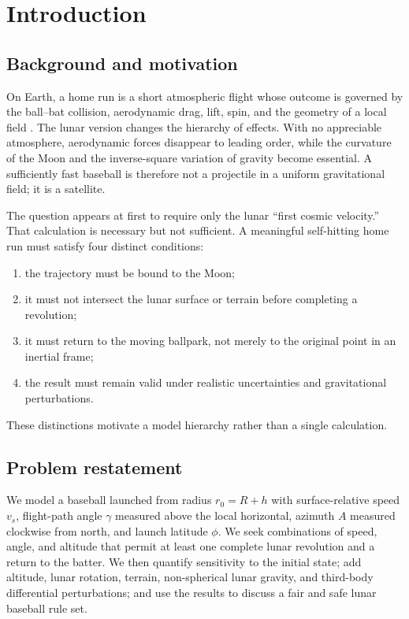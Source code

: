 \maketitle

\clearpage
\tableofcontents
\newpage
\section{Introduction}

\subsection{Background and motivation}

On Earth, a home run is a short atmospheric flight whose outcome is governed by the ball--bat collision, aerodynamic drag, lift, spin, and the geometry of a local field \cite{Nathan2000,Adair2002}. The lunar version changes the hierarchy of effects. With no appreciable atmosphere, aerodynamic forces disappear to leading order, while the curvature of the Moon and the inverse-square variation of gravity become essential. A sufficiently fast baseball is therefore not a projectile in a uniform gravitational field; it is a satellite.

The question appears at first to require only the lunar ``first cosmic velocity.'' That calculation is necessary but not sufficient. A meaningful self-hitting home run must satisfy four distinct conditions:
\begin{enumerate}
    \item the trajectory must be bound to the Moon;
    \item it must not intersect the lunar surface or terrain before completing a revolution;
    \item it must return to the moving ballpark, not merely to the original point in an inertial frame;
    \item the result must remain valid under realistic uncertainties and gravitational perturbations.
\end{enumerate}
These distinctions motivate a model hierarchy rather than a single calculation.

\subsection{Problem restatement}

We model a baseball launched from radius $r_0=R+h$ with surface-relative speed $v_s$, flight-path angle $\gamma$ measured above the local horizontal, azimuth $A$ measured clockwise from north, and launch latitude $\phi$. We seek combinations of speed, angle, and altitude that permit at least one complete lunar revolution and a return to the batter. We then quantify sensitivity to the initial state; add altitude, lunar rotation, terrain, non-spherical lunar gravity, and third-body differential perturbations; and use the results to discuss a fair and safe lunar baseball rule set.

